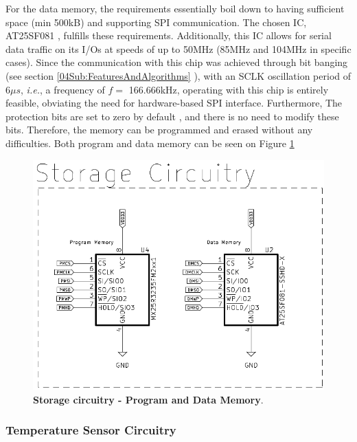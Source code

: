 For the data memory, the requirements essentially boil down to having sufficient space (min 500kB) and supporting SPI communication. The chosen IC, 
AT25SF081 \cite{DataMemoryAT}, fulfills these requirements. Additionally, this IC allows for serial data traffic on its I/Os at speeds of up to 50MHz 
(85MHz and 104MHz in specific cases). Since the communication with this chip was achieved through bit banging (see section \ref{04Sub:FeaturesAndAlgorithms}
), with an SCLK oscillation period of 6$\mu s$, \textit{i.e.}, a frequency of $f = $ 166.666kHz, operating with this chip is entirely feasible, obviating the 
need for hardware-based SPI interface. Furthermore, The protection bits are set to zero by default \cite{DataMemoryAT}, and there is no need to modify these bits. 
Therefore, the memory can be programmed and erased without any difficulties. Both program and data memory can be seen on Figure 
\ref{02fig:storageCircuitry}


\begin{figure}[H]
    \centering
    \includegraphics[scale = 0.6]{imagens/storageCircuitry.png}
    \caption{\textbf{Storage circuitry - Program and Data Memory}.}
    \label{02fig:storageCircuitry}
\end{figure}








\subsubsection{Temperature Sensor Circuitry}\label{02SubSub:TemperatureSensorCircuitry}


